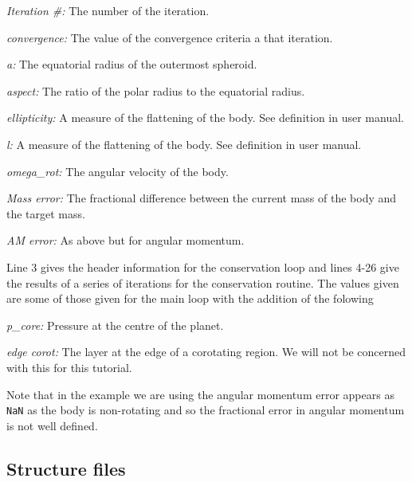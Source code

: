 \documentclass[11pt, oneside]{article}   	%
\begin{document}
\setlength{\parskip}{0pt}
\setlength{\leftskip}{1.5cm}
\setlength{\parindent}{-1.5cm}

{\it Iteration \#:} The number of the iteration.

{\it convergence:} The value of the convergence criteria a that iteration.

{\it a:} The equatorial radius of the outermost spheroid.

{\it aspect:} The ratio of the polar radius to the equatorial radius.

{\it ellipticity:} A measure of the flattening of the body. See definition in user manual.

{\it l:} A measure of the flattening of the body. See definition in user manual.

{\it omega\_rot:} The angular velocity of the body.

{\it Mass error:} The fractional difference between the current mass of the body and the target mass.

{\it AM error:} As above but for angular momentum. \\

\setlength{\leftskip}{0pt}
\setlength{\parskip}{0 pt}
\setlength{\parindent}{15pt}

Line 3 gives the header information for the conservation loop and lines 4-26 give the results of a series of iterations for the conservation routine. The values given are some of those given for the main loop with the addition of the folowing \\

\setlength{\parskip}{0pt}
\setlength{\leftskip}{1.5cm}
\setlength{\parindent}{-1.5cm}

{\it p\_core:} Pressure at the centre of the planet.

{\it edge corot:} The layer at the edge of a corotating region. We will not be concerned with this for this tutorial. \\

\setlength{\leftskip}{0pt}
\setlength{\parskip}{0 pt}
\setlength{\parindent}{15pt}

Note that in the example we are using the angular momentum error appears as \texttt{NaN} as the body is non-rotating and so the fractional error in angular momentum is not well defined. 

\subsection{Structure files}
\end{document}
